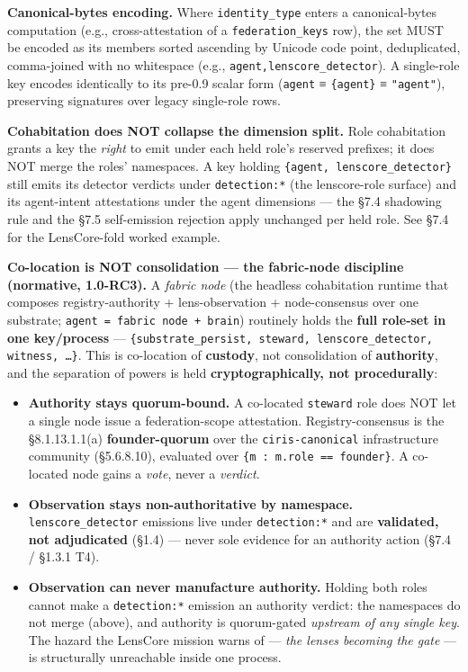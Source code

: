 \documentclass[11pt]{article}
\begin{document}
\textbf{Canonical-bytes encoding.} Where \texttt{identity\_type} enters a canonical-bytes computation (e.g., cross-attestation of a \texttt{federation\_keys} row), the set MUST be encoded as its members sorted ascending by Unicode code point, deduplicated, comma-joined with no whitespace (e.g., \texttt{agent,lenscore\_detector}). A single-role key encodes identically to its pre-0.9 scalar form (\texttt{agent} ≡ \texttt{\{agent\}} ≡ \texttt{"agent"}), preserving signatures over legacy single-role rows.


\textbf{Cohabitation does NOT collapse the dimension split.} Role cohabitation grants a key the \textit{right} to emit under each held role's reserved prefixes; it does NOT merge the roles' namespaces. A key holding \texttt{\{agent, lenscore\_detector\}} still emits its detector verdicts under \texttt{detection:*} (the lenscore-role surface) and its agent-intent attestations under the agent dimensions — the §7.4 shadowing rule and the §7.5 self-emission rejection apply unchanged per held role. See §7.4 for the LensCore-fold worked example.


\textbf{Co-location is NOT consolidation — the fabric-node discipline (normative, 1.0-RC3).} A \textit{fabric node} (the headless cohabitation runtime that composes registry-authority + lens-observation + node-consensus over one substrate; \texttt{agent = fabric node + brain}) routinely holds the \textbf{full role-set in one key/process} — \texttt{\{substrate\_persist, steward, lenscore\_detector, witness, …\}}. This is co-location of \textbf{custody}, not consolidation of \textbf{authority}, and the separation of powers is held \textbf{cryptographically, not procedurally}:


\begin{itemize}\setlength\itemsep{0pt}
\item \textbf{Authority stays quorum-bound.} A co-located \texttt{steward} role does NOT let a single node issue a federation-scope attestation. Registry-consensus is the §8.1.13.1.1(a) \textbf{founder-quorum} over the \texttt{ciris-canonical} infrastructure community (§5.6.8.10), evaluated over \texttt{\{m : m.role == founder\}}. A co-located node gains a \textit{vote}, never a \textit{verdict}.
\item \textbf{Observation stays non-authoritative by namespace.} \texttt{lenscore\_detector} emissions live under \texttt{detection:*} and are \textbf{validated, not adjudicated} (§1.4) — never sole evidence for an authority action (§7.4 / §1.3.1 T4).
\item \textbf{Observation can never manufacture authority.} Holding both roles cannot make a \texttt{detection:*} emission an authority verdict: the namespaces do not merge (above), and authority is quorum-gated \textit{upstream of any single key}. The hazard the LensCore mission warns of — \textit{the lenses becoming the gate} — is structurally unreachable inside one process.
\end{itemize}
\end{document}
